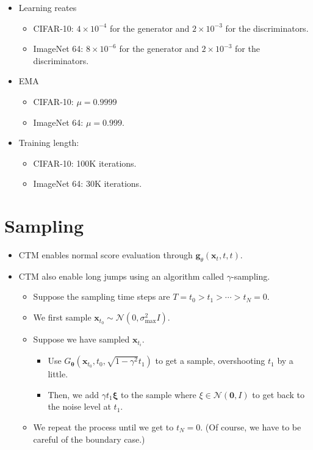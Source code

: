\documentclass[10pt]{article}
\newcommand{\ve}[1]{\mathbf{#1}}
\newcommand{\ves}[1]{\boldsymbol{#1}}
\newcommand{\mcal}[1]{\mathcal{#1}}
\begin{document}
\begin{itemize}
  \item Learning reates
  \begin{itemize}
    \item CIFAR-10: $4 \times 10^{-4}$ for the generator and $2 \times 10^{-3}$ for the discriminators.
    \item ImageNet 64: $8 \times 10^{-6}$ for the generator and $2 \times 10^{-3}$ for the discriminators.
  \end{itemize}

  \item EMA
  \begin{itemize}
    \item CIFAR-10: $\mu = 0.9999$
    \item ImageNet 64: $\mu = 0.999$.
  \end{itemize}

  \item Training length:
  \begin{itemize}
    \item CIFAR-10: 100K iterations.
    \item ImageNet 64: 30K iterations.
  \end{itemize}
\end{itemize}

\section{Sampling}

\begin{itemize}
  \item CTM enables normal score evaluation through $\ve{g}_{\theta}(\ve{x}_t, t, t)$.
  
  \item CTM also enable long jumps using an algorithm called $\gamma$-sampling.
  \begin{itemize}
    \item Suppose the sampling time steps are $T = t_0 > t_1 > \dotsb > t_N = 0$.
    \item We first sample $\ve{x}_{t_0} \sim \mcal{N}(0, \sigma_{\max}^2 I)$.
    \item Suppose we have sampled $\ve{x}_{t_i}$.
    \begin{itemize}
      \item Use $G_{\ves{\theta}}(\ve{x}_{t_0}, t_0, \sqrt{1 - \gamma^2} t_1)$ to get a sample, overshooting $t_1$ by a little.
      \item Then, we add $\gamma t_1 \ves{\xi}$ to the sample where $\xi \in \mcal{N}(\ve{0},I)$ to get back to the noise level at $t_1$.
    \end{itemize}
    \item We repeat the process until we get to $t_N = 0$. (Of course, we have to be careful of the boundary case.)
  \end{itemize}
\end{itemize}
\end{document}
